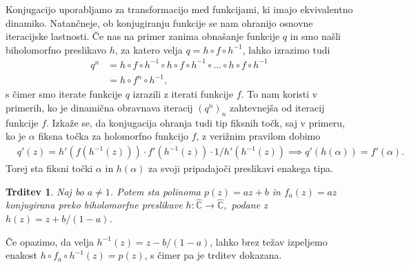 \documentclass[12pt,a4paper]{amsart}
\theoremstyle{definition} %
\theoremstyle{plain} %
\newtheorem{trditev}[definicija]{Trditev}
\begin{document}
Konjugacijo uporabljamo za transformacijo med funkcijami,
ki imajo ekvivalentno dinamiko. Natančneje, ob konjugiranju funkcije se nam ohranijo osnovne iteracijske lastnosti.
Če nas na primer zanima obnašanje funkcije $q$ in smo našli biholomorfno preslikavo $h$, 
za katero velja $q = h \circ f \circ h^{-1}$, lahko izrazimo tudi
\begin{equation*}
\begin{aligned}
q^n &= h \circ f \circ h^{-1} \circ h \circ f \circ h^{-1} \circ \dots \circ h \circ f \circ h^{-1} \\
&= h \circ f^n \circ h^{-1},
\end{aligned}
\end{equation*}
s čimer smo iterate funkcije $q$ izrazili z iterati funkcije $f$. 
To nam koristi v primerih, ko je dinamična obravnava iteracij $(q^n)_n$ 
zahtevnejša od iteracij funkcije $f$.
Izkaže se, da konjugacija ohranja tudi tip fiksnih točk, 
saj v primeru, ko je $\alpha$ fiksna točka za holomorfno funkcijo $f$, z verižnim pravilom dobimo
\begin{align*}
&q'(z) = h'(f(h^{-1}(z))) \cdot f'(h^{-1}(z)) \cdot  1 / h'(h^{-1}(z)) \implies q'(h(\alpha)) = f'(\alpha).
\end{align*}
Torej sta fiksni točki $\alpha$ in $h(\alpha)$ za svoji pripadajoči preslikavi enakega tipa.

\begin{trditev}
Naj bo $a \neq 1$. Potem sta polinoma $p(z) = az + b$ in $f_a(z) = az$ konjugirana preko 
biholomorfne preslikave $h\colon\hat{\mathbb{C}}\to \hat{\mathbb{C}},$ podane z $h(z) = z + b / (1 - a)$.
\end{trditev}

\proof
Če opazimo, da velja $h^{-1}(z) = z - b / (1 - a)$, lahko brez težav izpeljemo enakost
$h \circ f_a \circ h^{-1} (z) = p(z)$, s čimer pa je trditev dokazana.
\endproof
\end{document}
